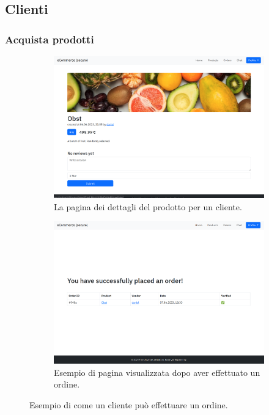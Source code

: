 \documentclass[conference,onecolumn,a4paper]{IEEEtran}
\begin{document}
{\subsection{Clienti}

\subsubsection{Acquista prodotti}

\begin{figure}[H]
    \centering
    \begin{subfigure}[b]{0.4\linewidth}
        \includegraphics[width=\linewidth]{resources/product-customer.png}
        \caption{La pagina dei dettagli del prodotto per un cliente.}
    \end{subfigure}
    \begin{subfigure}[b]{0.4\linewidth}
        \includegraphics[width=\linewidth]{resources/order.png}
        \caption{Esempio di pagina visualizzata dopo aver effettuato un ordine.}
    \end{subfigure}
    \caption{Esempio di come un cliente può effettuare un ordine.}
\end{figure}

}
\end{document}
